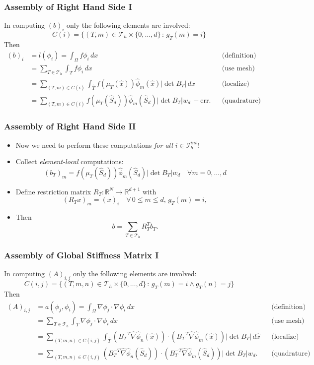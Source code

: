 \documentclass[aspectratio=169,11pt]{beamer}
\theoremstyle{definition}
\begin{document}
\begin{frame}
\frametitle{Assembly of Right Hand Side I}
In computing $(b)_i$ only the following elements are involved:
$$C(i) = \{(T,m)\in\mathcal{T}_h\times\{0,\ldots,d\} \,:\, g_T(m)=i\}$$
Then
\begin{align*}
(b)_i &= l(\phi_i) = \int_\Omega f \phi_i\,dx &&\text{(definition)} \\
&= \sum_{T\in\mathcal{T}_h} \int_T f \phi_i\,dx &&\text{(use mesh)} \\
&= \sum_{(T,m)\in C(i)} \int_{\hat T} f(\mu_T(\hat x)) \hat\phi_m(\hat x) |\det B_T|\,dx
&&\text{(localize)} \\
&= \sum_{(T,m)\in C(i)}
f(\mu_T(\hat S_d)) \hat\phi_m(\hat S_d) |\det B_T| w_d \, + \text{err}. &&\text{(quadrature)}
\end{align*}
\end{frame}

\begin{frame}
\frametitle{Assembly of Right Hand Side II}
\begin{itemize}
\item Now we need to perform these computations {\em for all $i\in\mathcal{I}_h^{int}$}!
\item Collect {\em element-local} computations:
\begin{equation*}
(b_T)_m =  f(\mu_T(\hat S_d)) \hat\phi_m(\hat S_d) |\det B_T| w_d \quad \forall m=0,\ldots,d
\end{equation*}
\item Define {restriction matrix} $R_T : \mathbb{R}^N \to \mathbb{R}^{d+1}$ with
\begin{equation*}
(R_T x)_m = (x)_i \quad \forall \,0\leq m \leq d, \,g_T(m)=i,
\end{equation*}
\item Then
\begin{equation*}
b = \sum_{T\in\mathcal{T}_h} R_T^T b_T .
\end{equation*}
\end{itemize}
\end{frame}

\begin{frame}
\frametitle{Assembly of Global Stiffness Matrix I}
In computing $(A)_{i,j}$ only the following elements are involved:
$$C(i,j) = \{(T,m,n)\in\mathcal{T}_h\times\{0,\ldots,d\} \,:\, g_T(m)=i \wedge g_T(n)=j\}$$
Then
{\small\begin{align*}
(A)_{i,j} &= a(\phi_j,\phi_i) = \int_\Omega \nabla \phi_j \cdot \nabla \phi_i \,dx
&&\text{(definition)}\\
&= \sum_{T\in\mathcal{T}_h} \int_T \nabla \phi_j \cdot \nabla \phi_i \,dx
&&\text{(use mesh)}\\
&= \sum_{(T,m,n)\in C(i,j)}
\int_{\hat T} (B_T^{-T} \hat\nabla\hat\phi_n(\hat x))\cdot (B_T^{-T} \hat\nabla\hat\phi_m(\hat x))
|\det B_T| \,d\hat x &&\text{(localize)}\\
&= \sum_{(T,m,n)\in C(i,j)}
(B_T^{-T} \hat\nabla\hat\phi_n(\hat S_d))\cdot (B_T^{-T} \hat\nabla\hat\phi_m(\hat S_d))
|\det B_T| w_d . &&\text{(quadrature)}
\end{align*}}
\end{frame}
\end{document}
